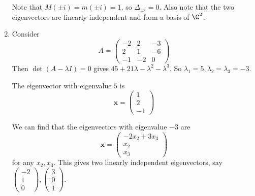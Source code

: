 \documentclass[a4paper]{article}
\begin{document}
\begin{eg}
\begin{enumerate}
          Note that $M(\pm i) = m(\pm i) = 1$, so $\Delta_{\pm i} = 0$. Also note that the two eigenvectors are linearly independent and form a basis of $\C^2$.
        \item Consider
          \[
            A = \begin{pmatrix}
              -2 & 2 & -3\\
              2 & 1 & -6\\
              -1 & -2 & 0
            \end{pmatrix}
          \]
          Then $\det(A - \lambda I) = 0$ gives $45 + 21\lambda - \lambda^2 - \lambda^3$. So $\lambda_1 = 5, \lambda_2 = \lambda_3 = -3$.

          The eigenvector with eigenvalue $5$ is
          \[
            \mathbf{x} =
            \begin{pmatrix}
              1\\2\\-1
            \end{pmatrix}
          \]

          We can find that the eigenvectors with eigenvalue $-3$ are
          \[
            \mathbf{x} =
            \begin{pmatrix}
              -2x_2 + 3x_3\\x_2\\x_3
            \end{pmatrix}
          \]
          for any $x_2, x_3$. This gives two linearly independent eigenvectors, say $
          \begin{pmatrix}
            -2\\1\\0
          \end{pmatrix},
          \begin{pmatrix}
            3\\0\\1
          \end{pmatrix}$.


\end{enumerate}
\end{eg}
\end{document}
